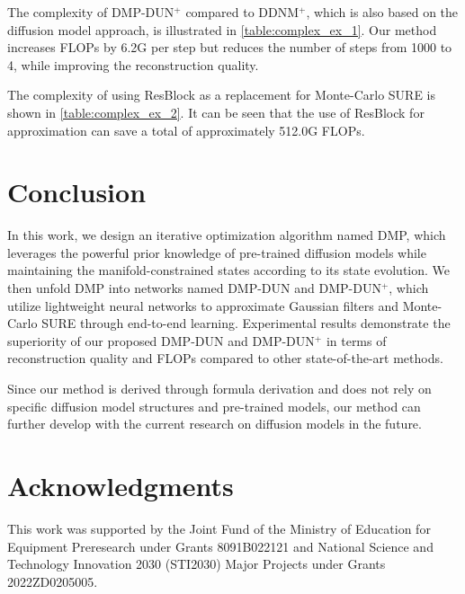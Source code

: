 \documentclass[10pt,twocolumn,letterpaper]{article}
\begin{document}
The complexity of DMP-DUN$^+$ compared to DDNM$^+$\cite{wang2022zero}, which is also based on the diffusion model approach, is illustrated in \cref{table:complex_ex_1}. Our method increases FLOPs by 6.2G per step but reduces the number of steps from 1000 to 4, while improving the reconstruction quality.

The complexity of using ResBlock as a replacement for Monte-Carlo SURE\cite{DBLP:journals/tip/RamaniBU08} is shown in \cref{table:complex_ex_2}. It can be seen that the use of ResBlock for approximation can save a total of approximately 512.0G FLOPs.

\section{Conclusion}
In this work, we design an iterative optimization algorithm named DMP, which leverages the powerful prior knowledge of pre-trained diffusion models while maintaining the manifold-constrained states according to its state evolution. We then unfold DMP into networks named DMP-DUN and DMP-DUN$^+$, which utilize lightweight neural networks to approximate Gaussian filters and Monte-Carlo SURE through end-to-end learning. Experimental results demonstrate the superiority of our proposed DMP-DUN and DMP-DUN$^+$ in terms of reconstruction quality and FLOPs compared to other state-of-the-art methods.

Since our method is derived through formula derivation and does not rely on specific diffusion model structures and pre-trained models, our method can further develop with the current research on diffusion models in the future.

\section*{Acknowledgments}

This work was supported by the Joint Fund of the Ministry of Education for Equipment Preresearch under Grants 8091B022121 and National Science and Technology Innovation 2030 (STI2030) Major Projects under Grants 2022ZD0205005.


{
	\small
	
	
}
\end{document}
